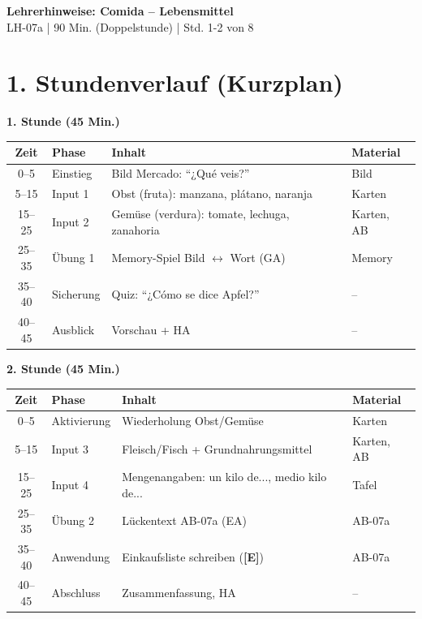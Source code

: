 \documentclass[11pt, a4paper]{article}
\newcommand{\fachfarbe}{spanisch}
\newcommand{\thema}{Comida -- Lebensmittel}
\newcommand{\sequenz}{07}
\newcommand{\block}{a}
\newcommand{\dauer}{90 Min. (Doppelstunde)}
\newcommand{\E}{\textcolor{erweiterung}{\textbf{[E]}}}
\begin{document}
\begin{center}
    {\Large\bfseries\textcolor{\fachfarbe}{Lehrerhinweise: \thema}}\\[0.3em]
    {\normalsize LH-\sequenz\block{} | \dauer{} | Std. 1-2 von 8}
\end{center}

\vspace{10pt}


\section*{1. Stundenverlauf (Kurzplan)}

\textbf{1. Stunde (45 Min.)}

\begin{tabularx}{\textwidth}{|c|l|X|l|}
\hline
\textbf{Zeit} & \textbf{Phase} & \textbf{Inhalt} & \textbf{Material} \\
\hline
0--5 & Einstieg & Bild Mercado: ``¿Qué veis?'' & Bild \\
\hline
5--15 & Input 1 & Obst (fruta): manzana, plátano, naranja & Karten \\
\hline
15--25 & Input 2 & Gemüse (verdura): tomate, lechuga, zanahoria & Karten, AB \\
\hline
25--35 & Übung 1 & Memory-Spiel Bild $\leftrightarrow$ Wort (GA) & Memory \\
\hline
35--40 & Sicherung & Quiz: ``¿Cómo se dice Apfel?'' & -- \\
\hline
40--45 & Ausblick & Vorschau + HA & -- \\
\hline
\end{tabularx}

\vspace{1em}

\textbf{2. Stunde (45 Min.)}

\begin{tabularx}{\textwidth}{|c|l|X|l|}
\hline
\textbf{Zeit} & \textbf{Phase} & \textbf{Inhalt} & \textbf{Material} \\
\hline
0--5 & Aktivierung & Wiederholung Obst/Gemüse & Karten \\
\hline
5--15 & Input 3 & Fleisch/Fisch + Grundnahrungsmittel & Karten, AB \\
\hline
15--25 & Input 4 & Mengenangaben: un kilo de..., medio kilo de... & Tafel \\
\hline
25--35 & Übung 2 & Lückentext AB-07a (EA) & AB-07a \\
\hline
35--40 & Anwendung & Einkaufsliste schreiben (\E{}) & AB-07a \\
\hline
40--45 & Abschluss & Zusammenfassung, HA & -- \\
\hline
\end{tabularx}
\end{document}
